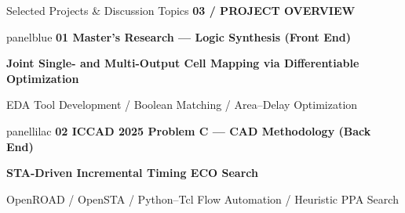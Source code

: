 \documentclass[aspectratio=169,10pt]{beamer}
\newcommand{\smalllabel}[1]{{\scriptsize\bfseries\color{Accent}\MakeUppercase{#1}}}
\newcommand{\slidenavigation}{}
\newcommand{\slideposition}{}
\newcommand{\slidesubtitle}[1]{%
  \smalllabel{#1}%
}
\begin{document}
\renewcommand{\slidenavigation}{\hyperlink{details-index}{\beamerbutton{Details index}}}
\renewcommand{\slideposition}{Summary 4 / 18}
\begin{frame}[label=summary-4]{Selected Projects \& Discussion Topics}
  \vspace{0.03cm}
  \slidesubtitle{03 / Project Overview}\par\vspace{0.11cm}
  \vfill
  \begin{beamercolorbox}[rounded=true,sep=0.20cm,wd=\linewidth]{panelblue}
    {\small\bfseries\color{AccentBlue}01 \quad Master's Research --- Logic Synthesis (Front End)}\par
    \vspace{0.05cm}
    {\normalsize\bfseries Joint Single- and Multi-Output Cell Mapping via Differentiable Optimization}\par
    \vspace{0.07cm}
    {\small EDA Tool Development \quad / \quad Boolean Matching \quad / \quad Area--Delay Optimization}
  \end{beamercolorbox}
  \vfill
  \begin{beamercolorbox}[rounded=true,sep=0.20cm,wd=\linewidth]{panellilac}
    {\small\bfseries\color{Accent}02 \quad ICCAD 2025 Problem C --- CAD Methodology (Back End)}\par
    \vspace{0.05cm}
    {\normalsize\bfseries STA-Driven Incremental Timing ECO Search}\par
    \vspace{0.07cm}
    {\small OpenROAD / OpenSTA \quad / \quad Python--Tcl Flow Automation \quad / \quad Heuristic PPA Search}
  \end{beamercolorbox}
  \vfill
\end{frame}

\end{document}
